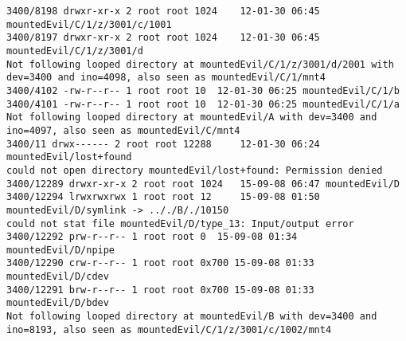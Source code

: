 \documentclass[12pt]{article}
\begin{document}
\begin{lstlisting}
3400/8198 drwxr-xr-x 2 root root 1024	 12-01-30 06:45 mountedEvil/C/1/z/3001/c/1001
3400/8197 drwxr-xr-x 2 root root 1024	 12-01-30 06:45 mountedEvil/C/1/z/3001/d
Not following looped directory at mountedEvil/C/1/z/3001/d/2001 with dev=3400 and ino=4098, also seen as mountedEvil/C/1/mnt4
3400/4102 -rw-r--r-- 1 root root 10	 12-01-30 06:25 mountedEvil/C/1/b
3400/4101 -rw-r--r-- 1 root root 10	 12-01-30 06:25 mountedEvil/C/1/a
Not following looped directory at mountedEvil/A with dev=3400 and ino=4097, also seen as mountedEvil/C/mnt4
3400/11 drwx------ 2 root root 12288	 12-01-30 06:24 mountedEvil/lost+found
could not open directory mountedEvil/lost+found: Permission denied
3400/12289 drwxr-xr-x 2 root root 1024	 15-09-08 06:47 mountedEvil/D
3400/12294 lrwxrwxrwx 1 root root 12	 15-09-08 01:50 mountedEvil/D/symlink -> .././B/./10150
could not stat file mountedEvil/D/type_13: Input/output error
3400/12292 prw-r--r-- 1 root root 0	 15-09-08 01:34 mountedEvil/D/npipe
3400/12290 crw-r--r-- 1 root root 0x700 15-09-08 01:33 mountedEvil/D/cdev
3400/12291 brw-r--r-- 1 root root 0x700 15-09-08 01:33 mountedEvil/D/bdev
Not following looped directory at mountedEvil/B with dev=3400 and ino=8193, also seen as mountedEvil/C/1/z/3001/c/1002/mnt4


\end{lstlisting}
\end{document}
